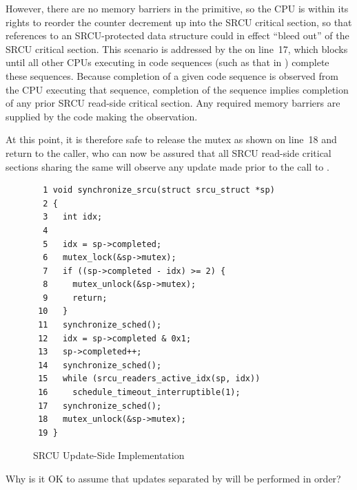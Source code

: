 However, there are no memory barriers in the 
primitive, so the CPU is within its rights to reorder the counter
decrement up into the SRCU critical section, so that references to
an SRCU-protected data structure could in effect ``bleed out'' of the
SRCU critical section.
This scenario is addressed by the  on line~17,
which blocks until all other CPUs executing in 
code sequences (such as that in ) complete these
sequences.
Because completion of a given  code sequence
is observed from the CPU executing that sequence, completion of the
sequence implies completion of any prior SRCU read-side critical section.
Any required memory barriers are supplied by the code making the
observation.

At this point, it is therefore safe to release the mutex as shown
on line~18 and return to the caller, who can now be assured that
all SRCU read-side critical sections sharing the same
 
will observe any update made prior to the call to .

\begin{figure}[htbp]
{ \scriptsize
\begin{verbatim}
  1 void synchronize_srcu(struct srcu_struct *sp)
  2 {
  3   int idx;
  4
  5   idx = sp->completed;
  6   mutex_lock(&sp->mutex);
  7   if ((sp->completed - idx) >= 2) {
  8     mutex_unlock(&sp->mutex);
  9     return;
 10   }
 11   synchronize_sched();
 12   idx = sp->completed & 0x1;
 13   sp->completed++;
 14   synchronize_sched();
 15   while (srcu_readers_active_idx(sp, idx))
 16     schedule_timeout_interruptible(1);
 17   synchronize_sched();
 18   mutex_unlock(&sp->mutex);
 19 }
\end{verbatim}
}
\caption{SRCU Update-Side Implementation}
\label{fig:app:rcuimpl:Update-Side Implementation}
\end{figure}

\QuickQuiz{}
	Why is it OK to assume that updates separated by
	 will be performed in order?
 \QuickQuizEnd

